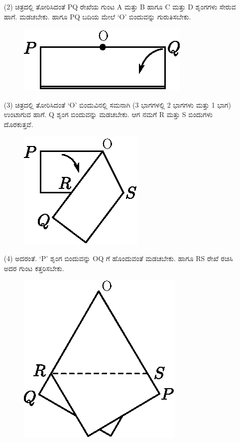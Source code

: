 \begin{itemize}
\begin{enumerate}
\item[(2)] ಚಿತ್ರದಲ್ಲಿ ತೋರಿಸಿದಂತೆ PQ ರೇಖೆಯ ಗುಂಟ A ಮತ್ತು  B ಹಾಗೂ  C ಮತ್ತು  D ಶೃಂಗಗಳು ಸೇರುವ ಹಾಗೆ. ಮಡಚಬೇಕು. ಹಾಗೂ PQ ಬದಿಯ ಮೇಲೆ `O' ಬಿಂದುವನ್ನು ಗುರುತಿಸಬೇಕು.
\begin{figure}[H]
\centering
\includegraphics[scale=.98]{src/figure/chap1/fig1-16b2.eps}
\end{figure}

\item[(3)] ಚಿತ್ರದಲ್ಲಿ ತೋರಿಸಿದಂತೆ  `O' ಬಿಂದುವಿನಲ್ಲಿ ಸಮನಾಗಿ (3 ಭಾಗಗಳಲ್ಲಿ 2 ಭಾಗಗಳು ಮತ್ತು 1 ಭಾಗ) ಉಂಟಾಗುವ ಹಾಗೆ. Q ಶೃಂಗ ಬಿಂದುವನ್ನು ಮಡಚಬೇಕು. ಆಗ ನಮಗೆ R ಮತ್ತು  S ಬಿಂದುಗಳು ದೊರಕುತ್ತವೆ. 
\begin{figure}[H]
\centering
\includegraphics[scale=.98]{src/figure/chap1/fig1-16b3.eps}
\end{figure}

\item[(4)] ಅದರಂತೆ. `P' ಶೃಂಗ ಬಿಂದುವನ್ನು OQ ಗೆ ಹೊಂದುವಂತೆ ಮಡಚಬೇಕು. ಹಾಗೂ RS ರೇಖೆ ರಚಿಸಿ ಅದರ ಗುಂಟ ಕತ್ತರಿಸಬೇಕು. 
\begin{figure}[H]
\centering
\includegraphics[scale=.98]{src/figure/chap1/fig1-16b4.eps}
\end{figure}


\end{enumerate}
\end{itemize}
